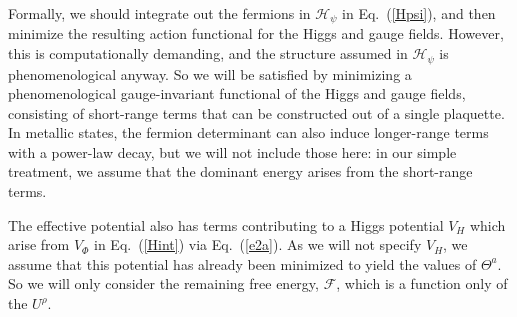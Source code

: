 \documentclass[aps,prb,preprint,onecolumn,citeautoscript,superscriptaddress,footinbib,
eqsecnum]{revtex4-1}
\begin{document}
Formally, we should integrate out the fermions in $\mathcal{H}_\psi$ in Eq.~(\ref{Hpsi}), and then minimize the 
resulting action functional for the Higgs and gauge fields. However, this is computationally demanding, and the structure assumed in $\mathcal{H}_\psi$ is phenomenological anyway. So we will be satisfied by minimizing a phenomenological gauge-invariant
functional of the Higgs and gauge fields, consisting of short-range terms that can be constructed out of a 
single plaquette. In metallic states, the fermion determinant can also induce longer-range terms with a power-law
decay, but we will not include those here: in our simple treatment, we assume that the dominant energy arises from the short-range terms.

The effective potential also has terms contributing to a Higgs potential $V_H$ which arise from $V_\Phi$ in Eq.~(\ref{Hint}) via Eq.~(\ref{e2a}). As we will not specify $V_H$, we assume that this potential has already 
been minimized to yield the values of $\Theta^a$. So we
will only consider the remaining free 
energy, $\mathcal{F}$, which is a function only of the $U^\rho$. 
\end{document}
